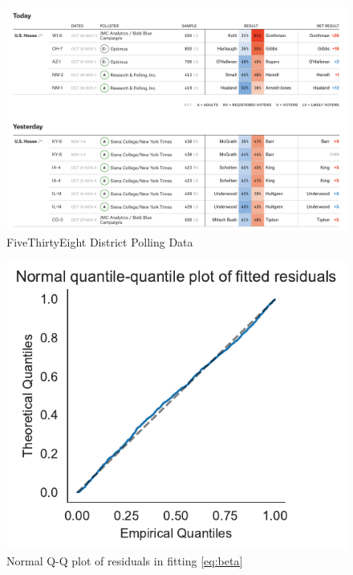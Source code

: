 \documentclass[12pt, letterpaper]{article}
\begin{document}
 \begin{figure}[tbh]
  \centering
  \includegraphics[scale=0.4]{district_polls}
  \caption{FiveThirtyEight District Polling Data}
  \label{fig:distpolls}
\end{figure}

\begin{figure}[tbh]
  \centering
  \includegraphics{qq.pdf}
  \caption{Normal Q-Q plot of residuals in fitting \eqref{eq:beta}}
  \label{fig:qq}
\end{figure}
\end{document}
